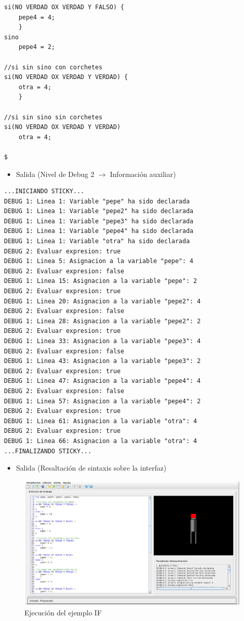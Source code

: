 \documentclass[a4paper, 12pt]{book}
\begin{document}
\begin{itemize}
\begin{verbatim}
si(NO VERDAD OX VERDAD Y FALSO) {
    pepe4 = 4;
    }
sino 
    pepe4 = 2;
    
//si sin sino con corchetes
si(NO VERDAD OX VERDAD Y VERDAD) {
    otra = 4;
    }

//si sin sino sin corchetes
si(NO VERDAD OX VERDAD Y VERDAD)
    otra = 4;

$
\end{verbatim}

  
  \begin{itemize}
  \item Salida (Nivel de Debug 2 $\rightarrow$ Información auxiliar)
  \end{itemize}
\begin{verbatim}
...INICIANDO STICKY...
DEBUG 1: Linea 1: Variable "pepe" ha sido declarada
DEBUG 1: Linea 1: Variable "pepe2" ha sido declarada
DEBUG 1: Linea 1: Variable "pepe3" ha sido declarada
DEBUG 1: Linea 1: Variable "pepe4" ha sido declarada
DEBUG 1: Linea 1: Variable "otra" ha sido declarada
DEBUG 2: Evaluar expresion: true
DEBUG 1: Linea 5: Asignacion a la variable "pepe": 4
DEBUG 2: Evaluar expresion: false
DEBUG 1: Linea 15: Asignacion a la variable "pepe": 2
DEBUG 2: Evaluar expresion: true
DEBUG 1: Linea 20: Asignacion a la variable "pepe2": 4
DEBUG 2: Evaluar expresion: false
DEBUG 1: Linea 28: Asignacion a la variable "pepe2": 2
DEBUG 2: Evaluar expresion: true
DEBUG 1: Linea 33: Asignacion a la variable "pepe3": 4
DEBUG 2: Evaluar expresion: false
DEBUG 1: Linea 43: Asignacion a la variable "pepe3": 2
DEBUG 2: Evaluar expresion: true
DEBUG 1: Linea 47: Asignacion a la variable "pepe4": 4
DEBUG 2: Evaluar expresion: false
DEBUG 1: Linea 57: Asignacion a la variable "pepe4": 2
DEBUG 2: Evaluar expresion: true
DEBUG 1: Linea 61: Asignacion a la variable "otra": 4
DEBUG 2: Evaluar expresion: true
DEBUG 1: Linea 66: Asignacion a la variable "otra": 4
...FINALIZANDO STICKY...
\end{verbatim}
  
  

  
  \begin{itemize}
  \item Salida (Resaltación de sintaxis sobre la interfaz)
  \end{itemize}
  \begin{figure}[htb]
    \centerline{\includegraphics[width=\textwidth]{./imagenes/if.png}}
    \caption{Ejecución del ejemplo IF}
  \end{figure}
  


\end{itemize}
\end{document}
